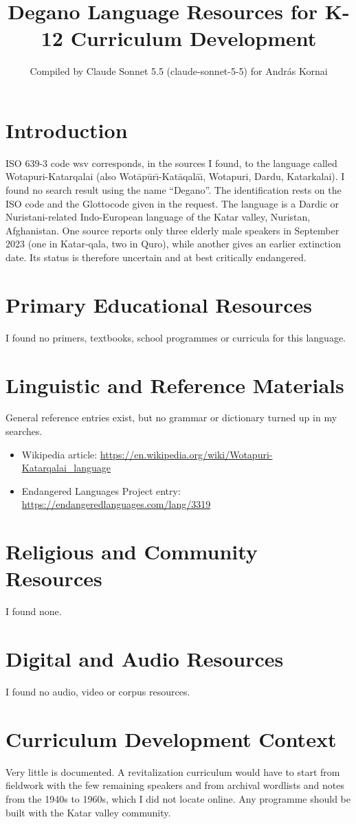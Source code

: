\documentclass[12pt]{article}
\title{Degano Language Resources for K-12 Curriculum Development}
\author{Compiled by Claude Sonnet 5.5 (claude-sonnet-5-5) for Andr\'as Kornai}
\date{}
\begin{document}
\maketitle

\section{Introduction}
ISO 639-3 code wsv corresponds, in the sources I found, to the language called Wotapuri-Katarqalai (also Wot\={a}p\={u}r\={\i}-Kat\={a}qal\={a}\={\i}, Wotapuri, Dardu, Katarkalai). I found no search result using the name ``Degano''. The identification rests on the ISO code and the Glottocode given in the request. The language is a Dardic or Nuristani-related Indo-European language of the Katar valley, Nuristan, Afghanistan. One source reports only three elderly male speakers in September 2023 (one in Katar-qala, two in Quro), while another gives an earlier extinction date. Its status is therefore uncertain and at best critically endangered.

\section{Primary Educational Resources}
I found no primers, textbooks, school programmes or curricula for this language.

\section{Linguistic and Reference Materials}
General reference entries exist, but no grammar or dictionary turned up in my searches.
\begin{itemize}
\item Wikipedia article: \url{https://en.wikipedia.org/wiki/Wotapuri-Katarqalai_language}
\item Endangered Languages Project entry: \url{https://endangeredlanguages.com/lang/3319}
\end{itemize}

\section{Religious and Community Resources}
I found none.

\section{Digital and Audio Resources}
I found no audio, video or corpus resources.

\section{Curriculum Development Context}
Very little is documented. A revitalization curriculum would have to start from fieldwork with the few remaining speakers and from archival wordlists and notes from the 1940s to 1960s, which I did not locate online. Any programme should be built with the Katar valley community.
\end{document}
